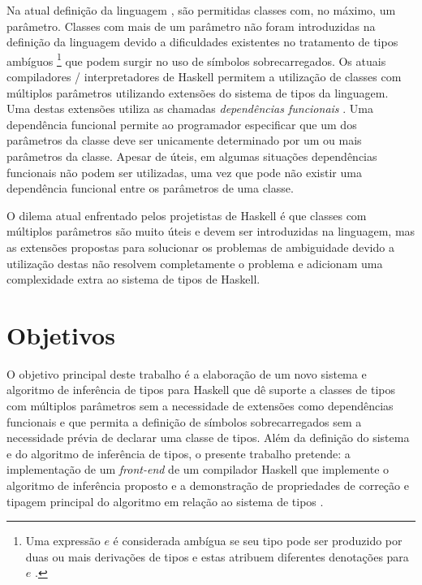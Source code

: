 Na atual defini\c{c}\~ao da linguagem \cite{Haskell98},
s\~ao permitidas classes com, no m\'aximo, um par\^ametro. Classes
com mais de um par\^ametro n\~ao foram introduzidas na
defini\c{c}\~ao da linguagem devido a dificuldades existentes no tratamento de tipos
amb\'iguos \footnote{Uma express\~ao $e$ \'e considerada amb\'igua se seu tipo
pode ser produzido por duas ou mais deriva\c{c}\~oes de tipos e estas atribuem
diferentes denota\c{c}\~oes para $e$ \cite{Mitchell96}.} que podem surgir no uso de s\'imbolos sobrecarregados. 
Os atuais compiladores / interpretadores de Haskell permitem a utiliza\c{c}\~ao de classes com m\'ultiplos par\^ametros 
utilizando extens\~oes do sistema de tipos da linguagem. Uma destas extens\~oes
utiliza as chamadas \emph{depend\^encias funcionais} \cite{Jones00}. Uma depend\^encia funcional
permite ao programador especificar que um dos par\^ametros da classe deve ser
unicamente determinado por um ou mais par\^ametros da
classe. Apesar de \'uteis, em algumas situa\c{c}\~oes depend\^encias funcionais 
n\~ao podem ser utilizadas, uma vez que pode n\~ao existir uma depend\^encia funcional entre os par\^ametros 
de uma classe. 

O dilema atual enfrentado pelos projetistas de Haskell \'e que classes com m\'ultiplos par\^ametros s\~ao muito \'uteis 
e devem ser introduzidas na linguagem, mas as extens\~oes propostas para solucionar os
problemas de ambiguidade devido a utiliza\c{c}\~ao destas n\~ao resolvem
completamente o problema e adicionam uma complexidade extra ao sistema de tipos
de Haskell.

\section{Objetivos}

O objetivo principal deste trabalho \'e a elabora\c{c}\~ao de um novo sistema e algoritmo de infer\^encia de tipos
para Haskell que d\^e suporte a classes de tipos com m\'ultiplos par\^ametros sem a necessidade de extens\~oes como
depend\^encias funcionais e que permita a defini\c{c}\~ao de s\'imbolos
sobrecarregados sem a necessidade pr\'evia de declarar uma classe de tipos.
Al\'em da defini\c{c}\~ao do sistema e do algoritmo de infer\^encia de tipos, o presente trabalho pretende:
a implementa\c{c}\~ao de um \emph{front-end} de um compilador Haskell que
implemente o algoritmo de infer\^encia proposto e a demonstra\c{c}\~ao de propriedades de corre\c{c}\~ao e tipagem
principal do algoritmo em rela\c{c}\~ao ao sistema de tipos \cite{Mitchell96, Wells02, Trevor96}.


